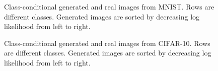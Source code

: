 \begin{figure}[tbp]

\newcommand{\imwidth}{0.8cm}
\newcommand{\colsep}{\hspace{1pt}}
\renewcommand{\arraystretch}{0.3}

\centering

\hfill
{}

\caption{Class-conditional generated and real images from MNIST\@. Rows are different classes. Generated images are sorted by decreasing log likelihood from left to right.}
\label{fig:mnist}

\end{figure}

\begin{figure}[tbp]

\newcommand{\imwidth}{0.8cm}
\newcommand{\colsep}{\hspace{1pt}}
\renewcommand{\arraystretch}{0.3}

\centering

\hfill
{}

\caption{Class-conditional generated and real images from CIFAR-10. Rows are different classes. Generated images are sorted by decreasing log likelihood from left to right.}
\label{fig:cifar10}

\end{figure}
